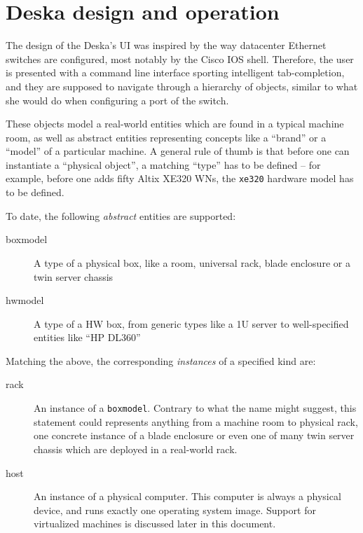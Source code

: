 \documentclass[11pt]{article}
\begin{document}
\section{Deska design and operation}

The design of the Deska's UI was inspired by the way datacenter Ethernet
switches are configured, most notably by the Cisco IOS shell.  Therefore, the
user is presented with a command line interface sporting intelligent
tab-completion, and they are supposed to navigate through a hierarchy of
objects, similar to what she would do when configuring a port of the switch.

These objects model a real-world entities which are found in a typical machine
room, as well as abstract entities representing concepts like a ``brand'' or a
``model'' of a particular machine.  A general rule of thumb is that before one
can instantiate a ``physical object'', a matching ``type'' has to be defined --
for example, before one adds fifty Altix XE320 WNs, the {\tt xe320} hardware
model has to be defined.

To date, the following {\em abstract} entities are supported:

\begin{description}
    \item[boxmodel] A type of a physical box, like a room, universal rack, blade
        enclosure or a twin server chassis
    \item[hwmodel] A type of a HW box, from generic types like a 1U server to
        well-specified entities like ``HP DL360''
\end{description}

Matching the above, the corresponding {\em instances} of a specified kind are:

\begin{description}
    \item[rack] An instance of a {\tt boxmodel}.  Contrary to what the name
        might suggest, this statement could represents anything from a machine
        room to physical rack, one concrete instance of a blade enclosure or
        even one of many twin server chassis which are deployed in a real-world
        rack.
    \item[host] An instance of a physical computer.  This computer is always a
        physical device, and runs exactly one operating system image.  Support
        for virtualized machines is discussed later in this document.
\end{description}
\end{document}
